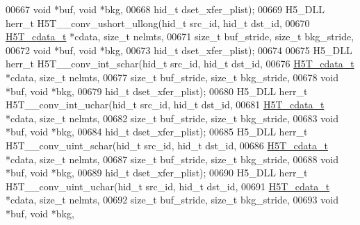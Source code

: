 \begin{DoxyCode}
00667                                      \textcolor{keywordtype}{void} *buf, \textcolor{keywordtype}{void} *bkg,
00668                                      hid\_t dset\_xfer\_plist);
00669 H5\_DLL herr\_t H5T\_\_conv\_ushort\_ullong(hid\_t src\_id, hid\_t dst\_id,
00670                       \hyperlink{struct_h5_t__cdata__t}{H5T\_cdata\_t} *cdata, \textcolor{keywordtype}{size\_t} nelmts,
00671                       \textcolor{keywordtype}{size\_t} buf\_stride, \textcolor{keywordtype}{size\_t} bkg\_stride,
00672                                       \textcolor{keywordtype}{void} *buf, \textcolor{keywordtype}{void} *bkg,
00673                                       hid\_t dset\_xfer\_plist);
00674 
00675 H5\_DLL herr\_t H5T\_\_conv\_int\_schar(hid\_t src\_id, hid\_t dst\_id,
00676                   \hyperlink{struct_h5_t__cdata__t}{H5T\_cdata\_t} *cdata, \textcolor{keywordtype}{size\_t} nelmts,
00677                   \textcolor{keywordtype}{size\_t} buf\_stride, \textcolor{keywordtype}{size\_t} bkg\_stride,
00678                                   \textcolor{keywordtype}{void} *buf, \textcolor{keywordtype}{void} *bkg,
00679                                   hid\_t dset\_xfer\_plist);
00680 H5\_DLL herr\_t H5T\_\_conv\_int\_uchar(hid\_t src\_id, hid\_t dst\_id,
00681                   \hyperlink{struct_h5_t__cdata__t}{H5T\_cdata\_t} *cdata, \textcolor{keywordtype}{size\_t} nelmts,
00682                   \textcolor{keywordtype}{size\_t} buf\_stride, \textcolor{keywordtype}{size\_t} bkg\_stride,
00683                                   \textcolor{keywordtype}{void} *buf, \textcolor{keywordtype}{void} *bkg,
00684                                   hid\_t dset\_xfer\_plist);
00685 H5\_DLL herr\_t H5T\_\_conv\_uint\_schar(hid\_t src\_id, hid\_t dst\_id,
00686                    \hyperlink{struct_h5_t__cdata__t}{H5T\_cdata\_t} *cdata, \textcolor{keywordtype}{size\_t} nelmts,
00687                    \textcolor{keywordtype}{size\_t} buf\_stride, \textcolor{keywordtype}{size\_t} bkg\_stride,
00688                                    \textcolor{keywordtype}{void} *buf, \textcolor{keywordtype}{void} *bkg,
00689                                    hid\_t dset\_xfer\_plist);
00690 H5\_DLL herr\_t H5T\_\_conv\_uint\_uchar(hid\_t src\_id, hid\_t dst\_id,
00691                    \hyperlink{struct_h5_t__cdata__t}{H5T\_cdata\_t} *cdata, \textcolor{keywordtype}{size\_t} nelmts,
00692                    \textcolor{keywordtype}{size\_t} buf\_stride, \textcolor{keywordtype}{size\_t} bkg\_stride,
00693                                    \textcolor{keywordtype}{void} *buf, \textcolor{keywordtype}{void} *bkg,

\end{DoxyCode}
